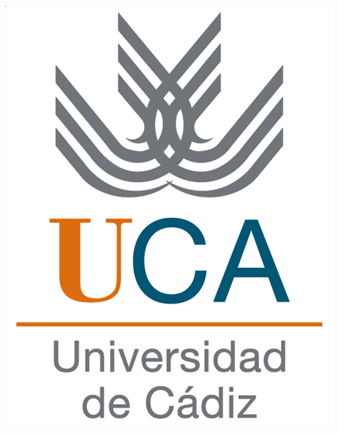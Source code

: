 %



\pagestyle{empty}
\begin{titlepage}

  \begin{center}

   \includegraphics[scale=0.2]{imagenes/logo_uca.png} 

    \vspace{2.0cm}


\end{center}
\end{titlepage}
